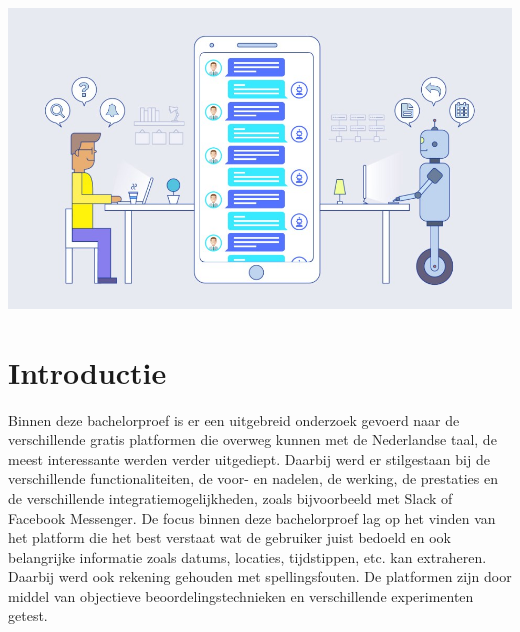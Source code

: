 \documentclass[a0,portrait]{a0poster}
\begin{document}
\begin{multicols}{2}
\begin{center}\vspace{1cm}
    \includegraphics[width=1.0\linewidth]{human-machine}
\end{center}\vspace{1cm}

\bigskip
\bigskip

\color{HoGentAccent1} 
\section*{Introductie}
\color{black}
\color{black}

Binnen deze bachelorproef is er een uitgebreid onderzoek gevoerd naar de verschillende
gratis platformen die overweg kunnen met de Nederlandse taal, de meest interessante
werden verder uitgediept. Daarbij werd er stilgestaan bij de verschillende functionaliteiten,
de voor- en nadelen, de werking, de prestaties en de verschillende integratiemogelijkheden,
zoals bijvoorbeeld met Slack of Facebook Messenger. De focus binnen deze bachelorproef
lag op het vinden van het platform die het best verstaat wat de gebruiker juist bedoeld en
ook belangrijke informatie zoals datums, locaties, tijdstippen, etc. kan extraheren. Daarbij
werd ook rekening gehouden met spellingsfouten. De platformen zijn door middel van
objectieve beoordelingstechnieken en verschillende experimenten getest.



\end{multicols}
\end{document}
